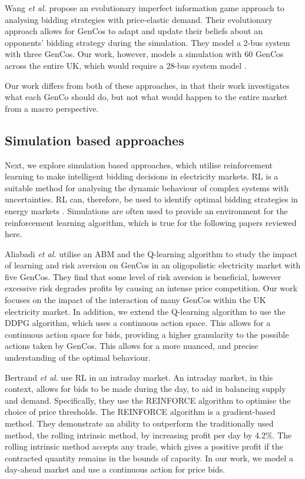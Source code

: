 Wang \textit{et al.} \cite{Wang2011} propose an evolutionary imperfect information game approach to analysing bidding strategies with price-elastic demand. Their evolutionary approach allows for GenCos to adapt and update their beliefs about an opponents' bidding strategy during the simulation. They model a 2-bus system with three GenCos. Our work, however, models a simulation with 60 GenCos across the entire UK, which would require a 28-bus system model \cite{Bell2010}. 

Our work differs from both of these approaches, in that their work investigates what each GenCo should do, but not what would happen to the entire market from a macro perspective.

\subsection{Simulation based approaches}

Next, we explore simulation based approaches, which utilise reinforcement learning to make intelligent bidding decisions in electricity markets. RL is a suitable method for analysing the dynamic behaviour of complex systems with uncertainties. RL can, therefore, be used to identify optimal bidding strategies in energy markets \cite{Yang2020}. Simulations are often used to provide an environment for the reinforcement learning algorithm, which is true for the following papers reviewed here.


Aliabadi \textit{et al.} \cite{EsmaeiliAliabadi2017} utilise an ABM and the Q-learning algorithm to study the impact of learning and risk aversion on GenCos in an oligopolistic electricity market with five GenCos. They find that some level of risk aversion is beneficial, however excessive risk degrades profits by causing an intense price competition. Our work focuses on the impact of the interaction of many GenCos within the UK electricity market. In addition, we extend the Q-learning algorithm to use the DDPG algorithm, which uses a continuous action space. This allows for a continuous action space for bids, providing a higher granularity to the possible actions taken by GenCos. This allows for a more nuanced, and precise understanding of the optimal behaviour.

Bertrand \textit{et al.} \cite{Bertrand2019} use RL in an intraday market. An intraday market, in this context, allows for bids to be made during the day, to aid in balancing supply and demand. Specifically, they use the REINFORCE algorithm to optimise the choice of price thresholds. The REINFORCE algorithm is a gradient-based method. They demonstrate an ability to outperform the traditionally used method, the rolling intrinsic method, by increasing profit per day by 4.2\%. The rolling intrinsic method accepts any trade, which gives a positive profit if the contracted quantity remains in the bounds of capacity. In our work, we model a day-ahead market and use a continuous action for price bids.


